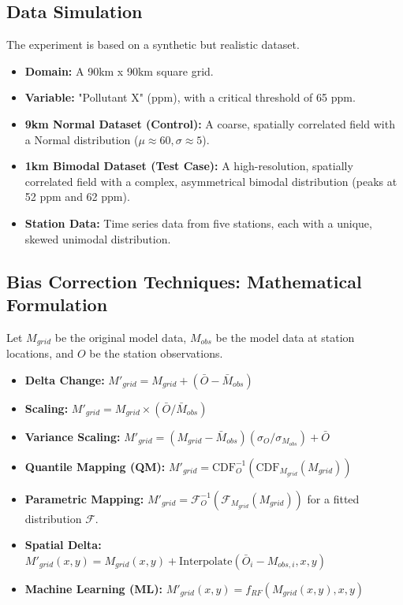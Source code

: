 \documentclass[11pt, a4paper]{article}
\begin{document}
\subsection{Data Simulation}
The experiment is based on a synthetic but realistic dataset.
\begin{itemize}
    \item \textbf{Domain:} A 90km x 90km square grid.
    \item \textbf{Variable:} "Pollutant X" (ppm), with a critical threshold of 65 ppm.
    \item \textbf{9km Normal Dataset (Control):} A coarse, spatially correlated field with a Normal distribution (\(\mu \approx 60, \sigma \approx 5\)).
    \item \textbf{1km Bimodal Dataset (Test Case):} A high-resolution, spatially correlated field with a complex, asymmetrical bimodal distribution (peaks at 52 ppm and 62 ppm).
    \item \textbf{Station Data:} Time series data from five stations, each with a unique, skewed unimodal distribution.
\end{itemize}

\subsection{Bias Correction Techniques: Mathematical Formulation}
Let $M_{grid}$ be the original model data, $M_{obs}$ be the model data at station locations, and $O$ be the station observations.

\begin{itemize}
    \item \textbf{Delta Change:} $M'_{grid} = M_{grid} + (\bar{O} - \bar{M}_{obs})$
    \item \textbf{Scaling:} $M'_{grid} = M_{grid} \times (\bar{O} / \bar{M}_{obs})$
    \item \textbf{Variance Scaling:} $M'_{grid} = (M_{grid} - \bar{M}_{obs}) (\sigma_{O} / \sigma_{M_{obs}}) + \bar{O}$
    \item \textbf{Quantile Mapping (QM):} $M'_{grid} = \text{CDF}_{O}^{-1} (\text{CDF}_{M_{grid}}(M_{grid}))$
    \item \textbf{Parametric Mapping:} $M'_{grid} = \mathcal{F}_{O}^{-1} (\mathcal{F}_{M_{grid}}(M_{grid}))$ for a fitted distribution $\mathcal{F}$.
    \item \textbf{Spatial Delta:} $M'_{grid}(x,y) = M_{grid}(x,y) + \text{Interpolate}(\bar{O}_i - M_{obs,i}, x, y)$
    \item \textbf{Machine Learning (ML):} $M'_{grid}(x,y) = f_{RF}(M_{grid}(x,y), x, y)$
\end{itemize}
\end{document}
